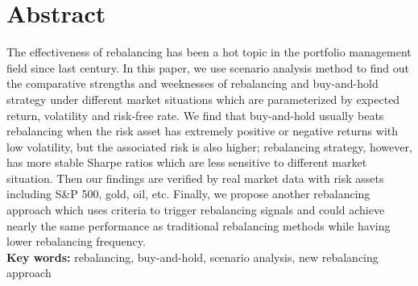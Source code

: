 \documentclass[
10pt, %
a4paper, %
oneside, %
headinclude,footinclude, %
BCOR5mm, %
]{scrartcl}
\begin{document}
\section*{Abstract} %
The effectiveness of rebalancing has been a hot topic in the portfolio management field since last century. In this paper, we use scenario analysis method to find out the comparative strengths and weeknesses of rebalancing and buy-and-hold strategy under different market situations which are parameterized by expected return, volatility and risk-free rate. We find that buy-and-hold usually beats rebalancing when the risk asset has extremely positive or negative returns with low volatility, but the associated risk is also higher; rebalancing strategy, however, has more stable Sharpe ratios which are less sensitive to different market situation. Then our findings are verified by real market data with risk assets including S\&P 500, gold, oil, etc. Finally, we propose another rebalancing approach which uses criteria to trigger rebalancing signals and could achieve nearly the same performance as traditional rebalancing methods while having lower rebalancing frequency.\\
\textbf{Key words:} rebalancing, buy-and-hold, scenario analysis, new rebalancing approach





\newpage %

\end{document}

